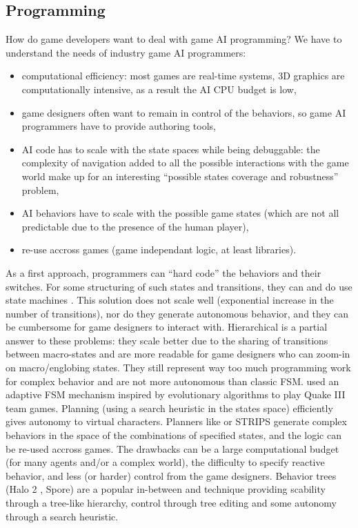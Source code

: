 \subsection{Programming}
How do game developers want to deal with game AI programming? We have to understand the needs of industry game AI programmers: 
\begin{itemize}
    \item computational efficiency: most games are real-time systems, 3D graphics are computationally intensive, as a result the AI CPU budget is low,
    \item game designers often want to remain in control of the behaviors, so game AI programmers have to provide authoring tools,
    \item AI code has to scale with the state spaces while being debuggable: the complexity of navigation added to all the possible interactions with the game world make up for an interesting ``possible states coverage and robustness'' problem,
    \item AI behaviors have to scale with the possible game states (which are not all predictable due to the presence of the human player),
    \item re-use accross games (game independant logic, at least libraries).
\end{itemize}
As a first approach, programmers can ``hard code'' the behaviors and their switches. For some structuring of such states and transitions, they can and do use state machines \citep{FSM_AIGameProgWisdom2003}. This solution does not scale well (exponential increase in the number of transitions), nor do they generate autonomous behavior, and they can be cumbersome for game designers to interact with. Hierarchical  is a partial answer to these problems: they scale better due to the sharing of transitions between macro-states and are more readable for game designers who can zoom-in on macro/englobing states. They still represent way too much programming work for complex behavior and are not more autonomous than classic FSM. \cite{Bakkes04} used an adaptive FSM mechanism inspired by evolutionary algorithms to play Quake III team games. Planning (using a search heuristic in the states space) efficiently gives autonomy to virtual characters. Planners like  \citep{Erol_htnplanning} or STRIPS \citep{FikesSTRIPS} generate complex behaviors in the space of the combinations of specified states, and the logic can be re-used accross games. The drawbacks can be a large computational budget (for many agents and/or a complex world), the difficulty to specify reactive behavior, and less (or harder) control from the game designers. Behavior trees (Halo 2 \citep{Isla}, Spore) are a popular in-between  and  technique providing scability through a tree-like hierarchy, control through tree editing and some autonomy through a search heuristic.
